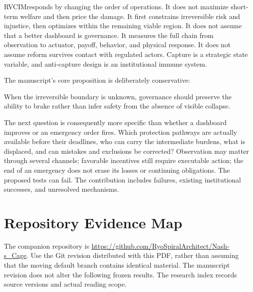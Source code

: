 \documentclass[11pt,a4paper]{article}
\numberwithin{equation}{section}
\theoremstyle{definition}
\theoremstyle{plain}
\theoremstyle{remark}
\newcommand{\RVCIM}{\textsc{RVCIM}}
\begin{document}
\RVCIM responds by changing the order of operations. It does not maximize short-term welfare and then price the damage. It first constrains irreversible risk and injustice, then optimizes within the remaining viable region. It does not assume that a better dashboard is governance. It measures the full chain from observation to actuator, payoff, behavior, and physical response. It does not assume reform survives contact with regulated actors. Capture is a strategic state variable, and anti-capture design is an institutional immune system.

The manuscript's core proposition is deliberately conservative:
\begin{corebox}
When the irreversible boundary is unknown, governance should preserve the ability to brake rather than infer safety from the absence of visible collapse.
\end{corebox}

The next question is consequently more specific than whether a dashboard improves or an emergency order fires. Which protection pathways are actually available before their deadlines, who can carry the intermediate burdens, what is displaced, and can mistakes and exclusions be corrected? Observation may matter through several channels; favorable incentives still require executable action; the end of an emergency does not erase its losses or continuing obligations. The proposed tests can fail. The contribution includes failures, existing institutional successes, and unresolved mechanisms.

\appendix
\section{Repository Evidence Map}
\label{app:evidence}

The companion repository is \url{https://github.com/RyoSpiralArchitect/Nash-s_Cage}.
Use the Git revision distributed with this PDF, rather than assuming that the moving default branch contains identical material. The manuscript revision does not alter the following frozen results. The research index records source versions and actual reading scope.
\end{document}
